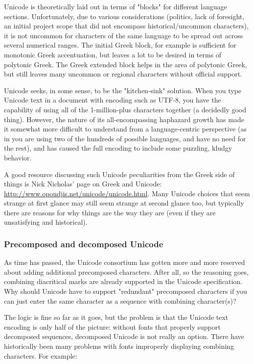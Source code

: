 \documentclass[11pt]{article}
\begin{document}
Unicode is theoretically laid out in terms of "blocks" for different language sections. Unfortunately, due to various considerations (politics, lack of foresight, an initial project scope that did not encompass historical/uncommon characters), it is not uncommon for characters of the same language to be spread out across several numerical ranges. The initial Greek block, for example is sufficient for monotonic Greek accentuation, but leaves a lot to be desired in terms of polytonic Greek. The Greek extended block helps in the area of polytonic Greek, but still leaves many uncommon or regional characters without official support.

Unicode seeks, in some sense, to be the "kitchen-sink" solution. When you type Unicode text in a document with encoding such as UTF-8, you have the capability of using all of the 1-million-plus characters together (a decidedly good thing). However, the nature of its all-encompassing haphazard growth has made it somewhat more difficult to understand from a language-centric perspective (as in you are using two of the hundreds of possible languages, and have no need for the rest), and has caused the full encoding to include some puzzling, kludgy behavior.

A good resource discussing such Unicode peculiarities from the Greek side of things is Nick Nicholas' page on Greek and Unicode: \url{http://www.opoudjis.net/unicode/unicode.html}. Many Unicode choices that seem strange at first glance may still seem strange at second glance too, but typically there are reasons for why things are the way they are (even if they are unsatisfying and historical).

\subsubsection{Precomposed and decomposed Unicode}
\label{sec:orgb122ec7}

As time has passed, the Unicode consortium has gotten more and more reserved about adding additional precomposed characters. After all, so the reasoning goes, combining diacritical marks are already supported in the Unicode specification. Why should Unicode have to support "redundant" precomposed characters if you can just enter the same character as a sequence with combining character(s)?

The logic is fine so far as it goes, but the problem is that the Unicode text encoding is only half of the picture: without fonts that properly support decomposed sequences, decomposed Unicode is not really an option. There have historically been many problems with fonts improperly displaying combining characters. For example:
\end{document}
